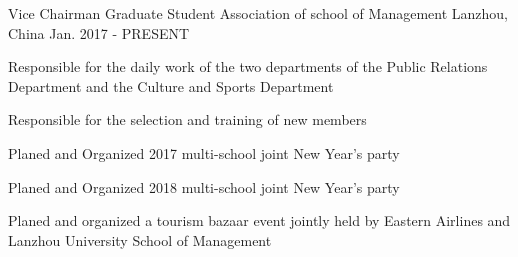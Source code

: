 \begin{cventries}
  \cventry
    {Vice Chairman}
    {Graduate Student Association of school of Management}
    {Lanzhou, China}
    {Jan. 2017 - PRESENT}
    {
      \begin{cvitems}
        \item {Responsible for the daily work of the two departments of the Public Relations Department and the Culture and Sports Department}
	\item {Responsible for the selection and training of new members}
	\item {Planed and Organized 2017 multi-school joint New Year’s party}
	\item {Planed and Organized 2018 multi-school joint New Year’s party}
	\item {Planed and organized a tourism bazaar event jointly held by Eastern Airlines and Lanzhou University School of Management}
      \end{cvitems}
    }
\end{cventries}
